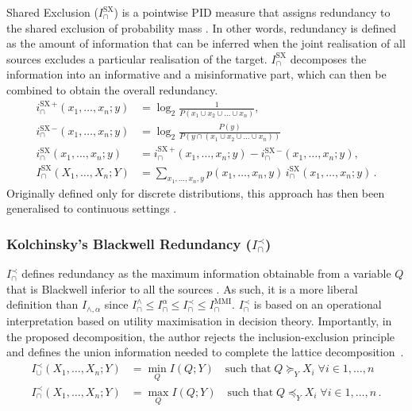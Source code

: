 \documentclass{article}
\newcommand{\Xs}{X_1,\ldots,X_n}
\newcommand{\XsY}{X_1,\ldots,X_n;Y}
\newcommand{\Iwedge}{\ensuremath{I_\cap^{\wedge}}\xspace}
\newcommand{\IMMI}{\ensuremath{I_\cap^{\text{MMI}}}\xspace}
\newcommand{\Ialpha}{\ensuremath{I_\cap^{\alpha}}\xspace}
\newcommand{\Iprec}{\ensuremath{I_\cap^{\prec}}\xspace}
\newcommand{\ISX}{\ensuremath{I_\cap^{\text{SX}}}\xspace}
\begin{document}
Shared Exclusion ($\ISX$) is a pointwise PID measure that assigns redundancy to the shared exclusion of probability mass \cite{makkeh2021introducing, schick2021partial, ehrlich2024partial}. In other words, redundancy is defined as the amount of information that can be inferred when the joint realisation of all sources excludes a particular realisation of the target. \ISX decomposes the information into an informative and a misinformative part, which can then be combined to obtain the overall redundancy.
\begin{align} \label{eq:SX-eq1}
i^{\text{SX}\,+}_{\cap}(x_1,\ldots,x_n;y)&= \log_2 \frac{1}{P(x_1 \cup x_2 \cup \ldots \cup x_n)}, \\ \label{eq:SX-eq2}
i^{\text{SX}\,-}_{\cap}(x_1,\ldots,x_n;y) &= \log_2 \frac{P(y)}{P\!\left(y \cap (x_1 \cup x_2 \cup \ldots \cup x_n)\right)} \\
i^{\text{SX}}_{\cap}(x_1,\ldots,x_n;y)&= i^{\text{SX}\,+}_{\cap}(x_1,\ldots,x_n;y)- i^{\text{SX}\,-}_{\cap}(x_1,\ldots,x_n;y), \\
\ISX(\XsY) & = \sum_{x_1,\ldots,x_n,y} p(x_1,\ldots,x_n,y)\, i_\cap^\text{SX}(x_1,\ldots,x_n;y) \,. 
\end{align}
Originally defined only for discrete distributions, this approach has then been generalised to continuous settings \cite{schick2021partial, ehrlich2024partial}.

\subsubsection*{Kolchinsky's Blackwell Redundancy ($\Iprec$)}

$\Iprec$ defines redundancy as the maximum information obtainable from a variable $Q$ that is Blackwell inferior to all the sources \cite{kolchinsky2022novel}. As such, it is a more liberal definition than $I_{\wedge,\alpha}$ since $\Iwedge\leq \Ialpha \leq \Iprec\leq \IMMI$. \Iprec is based on an operational interpretation based on utility maximisation in decision theory. Importantly, in the proposed decomposition, the author rejects the inclusion-exclusion principle and defines the union information needed to complete the lattice decomposition~\cite{kolchinsky2022novel}.  
\begin{align}
    I_\cup^\prec(\Xs;Y) & = \min_{Q} I(Q;Y) \quad\text{such that}\; Q\succeq_Y X_i \; \forall i \in 1 , \ldots , n \\
    I_\cap^\prec(\Xs;Y) & = \max_{Q} I(Q;Y) \quad\text{such that}\; Q\preceq_Y X_i \; \forall i \in 1 , \ldots , n \,.
\end{align}
\end{document}
